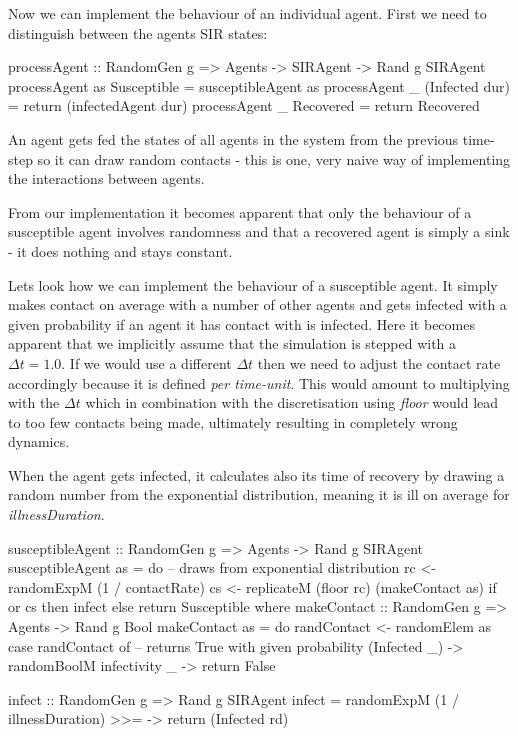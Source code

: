 Now we can implement the behaviour of an individual agent. First we need to distinguish between the agents SIR states:

\begin{HaskellCode}
processAgent :: RandomGen g => Agents -> SIRAgent -> Rand g SIRAgent
processAgent as Susceptible    = susceptibleAgent as
processAgent _  (Infected dur) = return (infectedAgent dur)
processAgent _  Recovered      = return Recovered
\end{HaskellCode}

An agent gets fed the states of all agents in the system from the previous time-step so it can draw random contacts - this is one, very naive way of implementing the interactions between agents.

From our implementation it becomes apparent that only the behaviour of a susceptible agent involves randomness and that a recovered agent is simply a sink - it does nothing and stays constant.

Lets look how we can implement the behaviour of a susceptible agent. It simply makes contact on average with a number of other agents and gets infected with a given probability if an agent it has contact with is infected. Here it becomes apparent that we implicitly assume that the simulation is stepped with a $\Delta t = 1.0$. If we would use a different $\Delta t$ then we need to adjust the contact rate accordingly because it is defined \textit{per time-unit}. This would amount to multiplying with the $\Delta t$ which in combination with the discretisation using \textit{floor} would lead to too few contacts being made, ultimately resulting in completely wrong dynamics.

When the agent gets infected, it calculates also its time of recovery by drawing a random number from the exponential distribution, meaning it is ill on average for \textit{illnessDuration}.

\begin{HaskellCode}
susceptibleAgent :: RandomGen g => Agents -> Rand g SIRAgent
susceptibleAgent as = do
    -- draws from exponential distribution
    rc <- randomExpM (1 / contactRate) 
    cs <- replicateM (floor rc) (makeContact as)
    if or cs
      then infect
      else return Susceptible
  where
    makeContact :: RandomGen g => Agents -> Rand g Bool
    makeContact as = do
      randContact <- randomElem as
      case randContact of
        -- returns True with given probability 
        (Infected _) -> randomBoolM infectivity 
        _            -> return False

    infect :: RandomGen g => Rand g SIRAgent
    infect = randomExpM (1 / illnessDuration) 
               >>= \rd -> return (Infected rd)
\end{HaskellCode}

